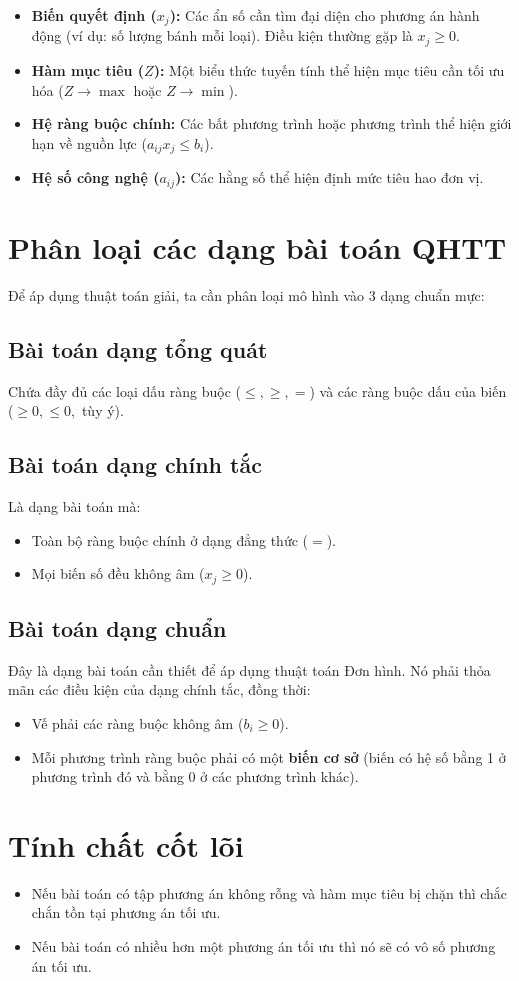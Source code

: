 \begin{itemize}
    \item \textbf{Biến quyết định ($x_j$):} Các ẩn số cần tìm đại diện cho phương án hành động (ví dụ: số lượng bánh mỗi loại). Điều kiện thường gặp là $x_j \ge 0$.
    \item \textbf{Hàm mục tiêu ($Z$):} Một biểu thức tuyến tính thể hiện mục tiêu cần tối ưu hóa ($Z \to \max$ hoặc $Z \to \min$).
    \item \textbf{Hệ ràng buộc chính:} Các bất phương trình hoặc phương trình thể hiện giới hạn về nguồn lực ($a_{ij} x_j \le b_i$).
    \item \textbf{Hệ số công nghệ ($a_{ij}$):} Các hằng số thể hiện định mức tiêu hao đơn vị.
\end{itemize}

\section{Phân loại các dạng bài toán QHTT}
Để áp dụng thuật toán giải, ta cần phân loại mô hình vào 3 dạng chuẩn mực:

\subsection{Bài toán dạng tổng quát}
Chứa đầy đủ các loại dấu ràng buộc ($\le, \ge, =$) và các ràng buộc dấu của biến ($ \ge 0, \le 0,$ tùy ý).

\subsection{Bài toán dạng chính tắc}
Là dạng bài toán mà:
\begin{itemize}
    \item Toàn bộ ràng buộc chính ở dạng đẳng thức ($=$).
    \item Mọi biến số đều không âm ($x_j \ge 0$).
\end{itemize}

\subsection{Bài toán dạng chuẩn}
Đây là dạng bài toán cần thiết để áp dụng thuật toán Đơn hình. Nó phải thỏa mãn các điều kiện của dạng chính tắc, đồng thời:
\begin{itemize}
    \item Vế phải các ràng buộc không âm ($b_i \ge 0$).
    \item Mỗi phương trình ràng buộc phải có một \textbf{biến cơ sở} (biến có hệ số bằng 1 ở phương trình đó và bằng 0 ở các phương trình khác).
\end{itemize}

\section{Tính chất cốt lõi}
\begin{itemize}
    \item Nếu bài toán có tập phương án không rỗng và hàm mục tiêu bị chặn thì chắc chắn tồn tại phương án tối ưu.
    \item Nếu bài toán có nhiều hơn một phương án tối ưu thì nó sẽ có vô số phương án tối ưu.
\end{itemize}